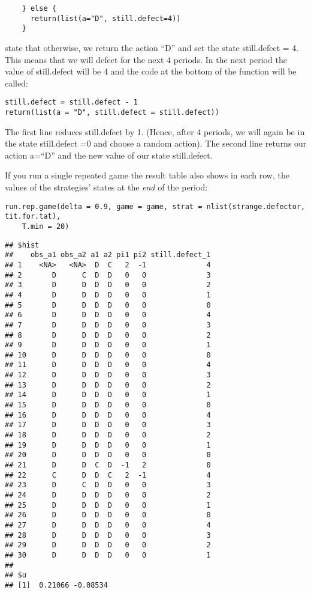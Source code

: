 \documentclass[]{article}
\begin{document}
\begin{verbatim}
    } else {
      return(list(a="D", still.defect=4))
    }
\end{verbatim}

state that otherwise, we return the action ``D'' and set the state
still.defect = 4. This means that we will defect for the next 4 periods.
In the next period the value of still.defect will be 4 and the code at
the bottom of the function will be called:

\begin{verbatim}
still.defect = still.defect - 1
return(list(a = "D", still.defect = still.defect))
\end{verbatim}

The first line reduces still.defect by 1. (Hence, after 4 periods, we
will again be in the state still.defect =0 and choose a random action).
The second line returns our action a=``D'' and the new value of our
state still.defect.

If you run a single repeated game the result table also shows in each
row, the values of the strategies' states at the \emph{end} of the
period:

\begin{verbatim}
run.rep.game(delta = 0.9, game = game, strat = nlist(strange.defector, tit.for.tat), 
    T.min = 20)
\end{verbatim}

\begin{verbatim}
## $hist
##    obs_a1 obs_a2 a1 a2 pi1 pi2 still.defect_1
## 1    <NA>   <NA>  D  C   2  -1              4
## 2       D      C  D  D   0   0              3
## 3       D      D  D  D   0   0              2
## 4       D      D  D  D   0   0              1
## 5       D      D  D  D   0   0              0
## 6       D      D  D  D   0   0              4
## 7       D      D  D  D   0   0              3
## 8       D      D  D  D   0   0              2
## 9       D      D  D  D   0   0              1
## 10      D      D  D  D   0   0              0
## 11      D      D  D  D   0   0              4
## 12      D      D  D  D   0   0              3
## 13      D      D  D  D   0   0              2
## 14      D      D  D  D   0   0              1
## 15      D      D  D  D   0   0              0
## 16      D      D  D  D   0   0              4
## 17      D      D  D  D   0   0              3
## 18      D      D  D  D   0   0              2
## 19      D      D  D  D   0   0              1
## 20      D      D  D  D   0   0              0
## 21      D      D  C  D  -1   2              0
## 22      C      D  D  C   2  -1              4
## 23      D      C  D  D   0   0              3
## 24      D      D  D  D   0   0              2
## 25      D      D  D  D   0   0              1
## 26      D      D  D  D   0   0              0
## 27      D      D  D  D   0   0              4
## 28      D      D  D  D   0   0              3
## 29      D      D  D  D   0   0              2
## 30      D      D  D  D   0   0              1
## 
## $u
## [1]  0.21066 -0.08534
\end{verbatim}
\end{document}
